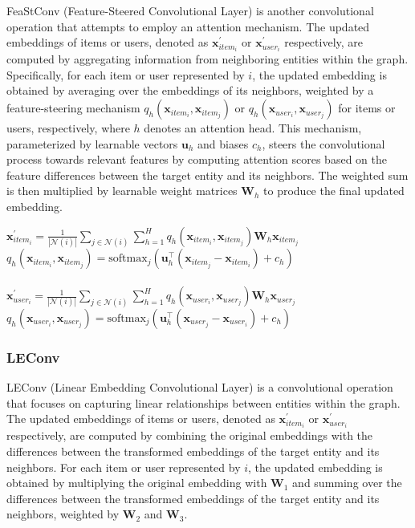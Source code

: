 \documentclass[bst/sn-nature]{sn-jnl}
\begin{document}
\begin{multicols}{2}
\quad FeaStConv (Feature-Steered Convolutional Layer) is another  convolutional operation that attempts to employ an attention mechanism. The updated embeddings of items or users, denoted as $\mathbf{x}^{\prime}_{item_i}$ or $\mathbf{x}^{\prime}_{user_i}$ respectively, are computed by aggregating information from neighboring entities within the graph. Specifically, for each item or user represented by $i$, the updated embedding is obtained by averaging over the embeddings of its neighbors, weighted by a feature-steering mechanism $q_h(\mathbf{x}_{item_i}, \mathbf{x}_{item_j})$ or $q_h(\mathbf{x}_{user_i}, \mathbf{x}_{user_j})$ for items or users, respectively, where $h$ denotes an attention head. This mechanism, parameterized by learnable vectors $\mathbf{u}_h$ and biases $c_h$, steers the convolutional process towards relevant features by computing attention scores based on the feature differences between the target entity and its neighbors. The weighted sum is then multiplied by learnable weight matrices $\mathbf{W}_h$ to produce the final updated embedding. \\ 

\begin{center}
    $\mathbf{x}^{\prime}_{item_{i}} = \frac{1}{|\mathcal{N}(i)|} \sum_{j \in \mathcal{N}(i)} \sum_{h=1}^H
    q_h(\mathbf{x}_{item_{i}}, \mathbf{x}_{item_{j}}) \mathbf{W}_h \mathbf{x}_{item_{j}}$ \\
    $q_h(\mathbf{x}_{item_{i}}, \mathbf{x}_{item_{j}}) = \mathrm{softmax}_{j}
    (\mathbf{u}_h^{\top} (\mathbf{x}_{item_{j}} - \mathbf{x}_{item_{i}}) + c_h)$
    \\~\\
    $\mathbf{x}^{\prime}_{user_{i}} = \frac{1}{|\mathcal{N}(i)|} \sum_{j \in \mathcal{N}(i)} \sum_{h=1}^H
    q_h(\mathbf{x}_{user_{i}}, \mathbf{x}_{user_{j}}) \mathbf{W}_h \mathbf{x}_{user_{j}}$ \\ 
     $q_h(\mathbf{x}_{user_{i}}, \mathbf{x}_{user_{j}}) = \mathrm{softmax}_j
    (\mathbf{u}_h^{\top} (\mathbf{x}_{user_{j}} - \mathbf{x}_{user_{i}}) + c_h)$
\end{center}


\subsubsection{LEConv\cite{leconv}} 

\quad LEConv (Linear Embedding Convolutional Layer) is a convolutional operation that focuses on capturing linear relationships between entities within the graph. The updated embeddings of items or users, denoted as $\mathbf{x}^{\prime}_{item_i}$ or $\mathbf{x}^{\prime}_{user_i}$ respectively, are computed by combining the original embeddings with the differences between the transformed embeddings of the target entity and its neighbors. For each item or user represented by $i$, the updated embedding is obtained by multiplying the original embedding with $\mathbf{W}_1$ and summing over the differences between the transformed embeddings of the target entity and its neighbors, weighted by $\mathbf{W}_2$ and $\mathbf{W}_3$. \\ 


\end{multicols}
\end{document}
